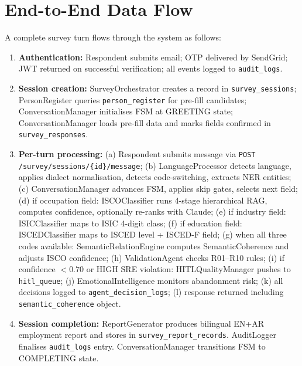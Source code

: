 \section{End-to-End Data Flow}
\label{sec:arch-dataflow}

A complete survey turn flows through the system as follows:

\begin{enumerate}
  \item \textbf{Authentication:} Respondent submits email; OTP delivered by
  SendGrid; JWT returned on successful verification; all events logged to
  \texttt{audit\_logs}.

  \item \textbf{Session creation:} SurveyOrchestrator creates a record in
  \texttt{survey\_sessions}; PersonRegister queries \texttt{person\_register}
  for pre-fill candidates; ConversationManager initialises FSM at GREETING
  state; ConversationManager loads pre-fill data and marks fields confirmed in
  \texttt{survey\_responses}.

  \item \textbf{Per-turn processing:}
  (a) Respondent submits message via \texttt{POST /\-survey/\-sessions/\-\{id\}/message};
  (b) LanguageProcessor detects language, applies dialect normalisation,
  detects code-switching, extracts NER entities;
  (c) ConversationManager advances FSM, applies skip gates, selects next field;
  (d) if occupation field: ISCOClassifier runs 4-stage hierarchical RAG,
  computes confidence, optionally re-ranks with Claude;
  (e) if industry field: ISICClassifier maps to ISIC 4-digit class;
  (f) if education field: ISCEDClassifier maps to ISCED level + ISCED-F field;
  (g) when all three codes available: SemanticRelationEngine computes
  SemanticCoherence and adjusts ISCO confidence;
  (h) ValidationAgent checks R01--R10 rules;
  (i) if confidence $< 0.70$ or HIGH SRE violation: HITLQualityManager pushes
  to \texttt{hitl\_queue};
  (j) EmotionalIntelligence monitors abandonment risk;
  (k) all decisions logged to \texttt{agent\_decision\_logs};
  (l) response returned including \texttt{semantic\_coherence} object.

  \item \textbf{Session completion:} ReportGenerator produces bilingual EN+AR
  employment report and stores in \texttt{survey\_report\_records}.
  AuditLogger finalises \texttt{audit\_logs} entry.
  ConversationManager transitions FSM to COMPLETING state.
\end{enumerate}
